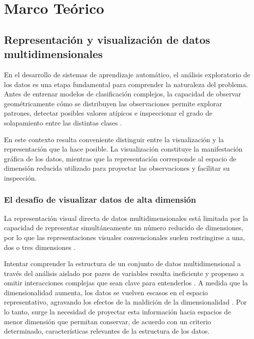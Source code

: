 
\chapter{Marco Teórico}
\label{chap:marco_teorico}



\section{Representación y visualización de datos multidimensionales}
\label{sec:Representacion_Visualizacion}

En el desarrollo de sistemas de aprendizaje automático, el análisis exploratorio de los datos es una etapa fundamental para comprender la naturaleza del problema. Antes de entrenar modelos de clasificación complejos, la capacidad de observar geométricamente cómo se distribuyen las observaciones permite explorar patrones, detectar posibles valores atípicos e inspeccionar el grado de solapamiento entre las distintas clases \cite{oettl2024artificial,abukmeil2021survey}. 

En este contexto resulta conveniente distinguir entre la visualización y 
la representación que la hace posible. La visualización constituye la manifestación gráfica de los datos, mientras que la representación corresponde al espacio de dimensión reducida utilizado para proyectar las observaciones y facilitar su inspección.



\subsection{El desafío de visualizar datos de alta dimensión}

La representación visual directa de datos multidimensionales está limitada por la capacidad de representar simultáneamente un número reducido de dimensiones, por lo que las representaciones visuales convencionales suelen restringirse a una, dos o tres dimensiones \cite{andrews1972plots,espadoto2021unprojection} .

 

Intentar comprender la estructura de un conjunto de datos multidimensional a través del análisis aislado por pares de variables resulta ineficiente y propenso a omitir interacciones complejas que sean clave para entenderlos \cite{neto2022multivariate}. A medida que la dimensionalidad aumenta, los datos se vuelven escasos en el espacio representativo, agravando los efectos de la maldición de la dimensionalidad \cite{peng2023interpreting}. Por lo tanto, surge la necesidad de proyectar esta información hacia espacios de menor dimensión que permitan conservar, de acuerdo con un criterio determinado, características relevantes de la estructura de los datos.



